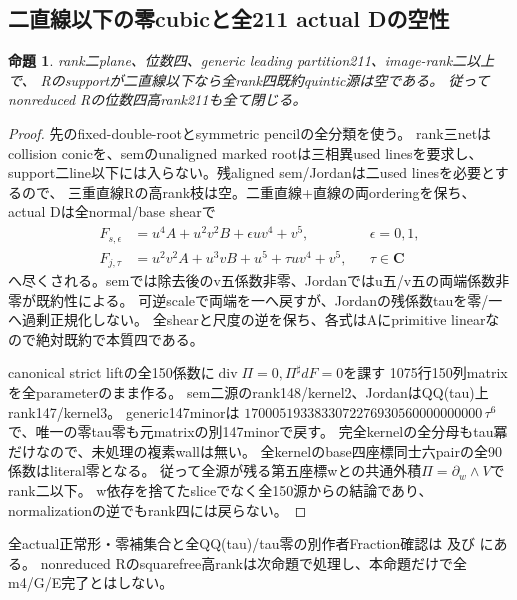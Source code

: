\documentclass[a4paper,11pt]{ltjsarticle}
\newtheorem{proposition}{命題}[section]
\theoremstyle{definition}
\newcommand{\CC}{\mathbf C}
\begin{document}
\subsection{二直線以下の零cubicと全211 actual Dの空性}
\begin{proposition}\label{prop:plane-m4-two-line-211-empty}
rank二plane、位数四、generic leading partition211、image-rank二以上で、
Rのsupportが二直線以下なら全rank四既約quintic源は空である。
従ってnonreduced Rの位数四高rank211も全て閉じる。
\end{proposition}
\begin{proof}
先のfixed-double-rootとsymmetric pencilの全分類を使う。
rank三netはcollision conicを、semのunaligned marked rootは三相異used linesを要求し、
support二line以下には入らない。残aligned sem/Jordanは二used linesを必要とするので、
三重直線Rの高rank枝は空。二重直線+直線の両orderingを保ち、actual Dは全normal/base shearで
\[
 \begin{aligned}
 F_{s,\epsilon}&=u^4A+u^2v^2B+\epsilon uv^4+v^5,&&\epsilon=0,1,\\
 F_{j,\tau}&=u^2v^2A+u^3vB+u^5+\tau uv^4+v^5,&&\tau\in\CC
 \end{aligned}
\]
へ尽くされる。semでは除去後のv五係数非零、Jordanではu五/v五の両端係数非零が既約性による。
可逆scaleで両端を一へ戻すが、Jordanの残係数tauを零/一へ過剰正規化しない。
全shearと尺度の逆を保ち、各式はAにprimitive linearなので絶対既約で本質四である。

canonical strict liftの全150係数に$\operatorname{div}\Pi=0,\Pi^\sharp dF=0$を課す
1075行150列matrixを全parameterのまま作る。
sem二源のrank148/kernel2、JordanはQQ(tau)上rank147/kernel3。
generic147minorは
$1700051933833072276930560000000000\,\tau^6$で、唯一の零tau零も元matrixの別147minorで戻す。
完全kernelの全分母もtau冪だけなので、未処理の複素wallは無い。
全kernelのbase四座標同士六pairの全90係数はliteral零となる。
従って全源が残る第五座標wとの共通外積$\Pi=\partial_w\wedge V$でrank二以下。
w依存を捨てたsliceでなく全150源からの結論であり、normalizationの逆でもrank四には戻らない。
\end{proof}
全actual正常形・零補集合と全QQ(tau)/tau零の別作者Fraction確認は
及び
にある。
nonreduced Rのsquarefree高rankは次命題で処理し、本命題だけで全m4/G/E完了とはしない。
\end{document}

